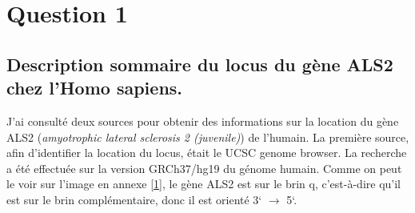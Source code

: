 \documentclass[10.8pt]{article} %
\begin{document}

\tableofcontents %

\newpage %

\section{Question 1} %

\subsection[Description du gène ALS2]{Description sommaire du locus du gène ALS2 chez l'Homo sapiens.}

J'ai consulté deux sources pour obtenir des informations sur la location du gène ALS2 (\emph{amyotrophic lateral sclerosis 2 (juvenile)}) de l'humain. La première source,
afin d'identifier la location du locus, était le UCSC genome browser. La recherche a été effectuée sur la version GRCh37/hg19
du génome humain. Comme on peut le voir sur l'image en annexe \ref{1}, le gène ALS2 est sur le brin q, c'est-à-dire qu'il est sur le brin complémentaire, donc il est orienté 3` $\rightarrow$ 5`.
\end{document}
